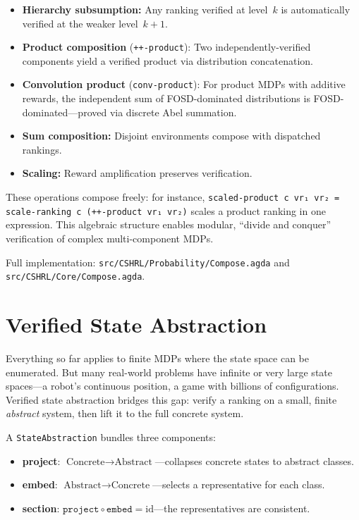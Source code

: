 \documentclass[9pt,a4paper]{article}
\newcommand{\fpath}[1]{\nolinkurl{#1}}
\theoremstyle{plain}
\theoremstyle{definition}
\theoremstyle{remark}
\begin{document}
\begin{itemize}
\item \textbf{Hierarchy subsumption:} Any ranking verified at level~$k$ is automatically verified at the weaker level~$k{+}1$.
\item \textbf{Product composition} (\texttt{++-product}): Two independently-verified components yield a verified product via distribution concatenation.
\item \textbf{Convolution product} (\texttt{conv-product}): For product MDPs with additive rewards, the independent sum of FOSD-dominated distributions is FOSD-dominated---proved via discrete Abel summation.
\item \textbf{Sum composition:} Disjoint environments compose with dispatched rankings.
\item \textbf{Scaling:} Reward amplification preserves verification.
\end{itemize}

\noindent These operations compose freely: for instance, \texttt{scaled-product~c~vr₁~vr₂ = scale-ranking~c~(++-product~vr₁~vr₂)} scales a product ranking in one expression.  This algebraic structure enables modular, ``divide and conquer'' verification of complex multi-component MDPs.

Full implementation: \fpath{src/CSHRL/Probability/Compose.agda} and \fpath{src/CSHRL/Core/Compose.agda}.

\section{Verified State Abstraction}\label{sec:abstraction}

Everything so far applies to finite MDPs where the state space can be enumerated.  But many real-world problems have infinite or very large state spaces---a robot's continuous position, a game with billions of configurations.  Verified state abstraction bridges this gap: verify a ranking on a small, finite \emph{abstract} system, then lift it to the full concrete system.

A \texttt{StateAbstraction} bundles three components:

\begin{itemize}
\item \textbf{project}: $\text{Concrete} \to \text{Abstract}$---collapses concrete states to abstract classes.
\item \textbf{embed}: $\text{Abstract} \to \text{Concrete}$---selects a representative for each class.
\item \textbf{section}: $\texttt{project} \circ \texttt{embed} = \text{id}$---the representatives are consistent.
\end{itemize}
\end{document}
